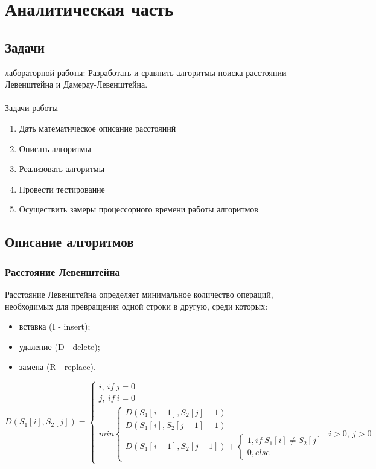 \documentclass[12pt, a4paper]{report}
\begin{document}
    \chapter{Аналитическая часть}

	\section{Задачи}
	{ лабораторной работы:} Разработать и сравнить алгоритмы поиска расстоянии Левенштейна и Дамерау-Левенштейна. \\
	\\
	Задачи работы
	\begin{enumerate}
		\item Дать математическое описание расстояний
		\item Описать алгоритмы
		\item Реализовать алгоритмы 
		\item Провести тестирование
		\item Осуществить замеры процессорного времени работы алгоритмов
	\end{enumerate}

	\section{Описание алгоритмов}
	\subsection{Расстояние Левенштейна}
	Расстояние Левенштейна определяет минимальное количество операций, необходимых для превращения одной строки в другую, среди которых:
	\begin{itemize}
		\item вставка (I - insert);
		\item удаление (D - delete);
		\item замена (R - replace).
	\end{itemize}
	
	\begin{equation}
	\label{formula_leven}
	D(S_{1}[i], S_{2}[j]) =
		\begin{cases}
		i, \ if\ j = 0\\
		j, \ if\ i = 0\\
		min \begin{cases}
		D(S_{1}[i-1], S_{2}[j] + 1)\\
		D(S_{1}[i], S_{2}[j-1]+1)\\
		D(S_{1}[i-1], S_{2}[j-1])+
			\begin{cases}
				1, if\  S_{1}[i] \neq S_{2}[j]\\
				0, else
			\end{cases}
		\end{cases}  i > 0,\  j > 0
	\end{cases}
	\end{equation}
\end{document}
